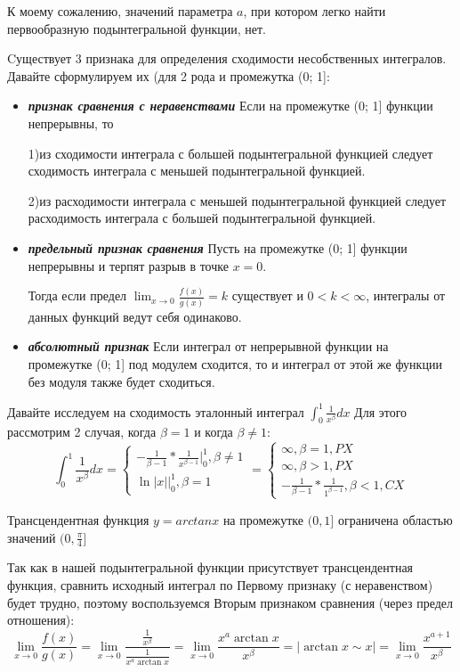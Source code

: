 \documentclass[12pt, a4paper]{article}
\begin{document}
К моему сожалению, значений параметра $a$, при котором легко найти первообразную подынтегральной функции, нет. 

Cуществует 3 признака для определения сходимости несобственных интегралов. Давайте сформулируем их (для 2 рода и промежутка (0; 1]:
\begin{itemize}
\item \textbf{\textit{признак сравнения с неравенствами}}
Если на промежутке (0; 1] функции непрерывны, то 

1)из сходимости интеграла с большей подынтегральной функцией следует сходимость интеграла с меньшей подынтегральной функцией.

2)из расходимости интеграла с меньшей подынтегральной функцией следует расходимость интеграла с большей подынтегральной функцией.
\item \textbf{\textit{предельный признак сравнения}}
Пусть на промежутке (0; 1] функции непрерывны и терпят разрыв в точке $x = 0$. 

Тогда если предел $\lim_{x\to0} \frac{f(x)}{g(x)} = k$ существует и $0 < k < \infty$, интегралы от данных функций ведут себя одинаково.
\item \textbf{\textit{абсолютный признак}} Если интеграл от непрерывной функции на промежутке (0; 1] под модулем сходится, то и интеграл от этой же функции без модуля также будет сходиться.
\end{itemize}

Давайте исследуем на сходимость эталонный интеграл $\int_0^1\frac{1}{x^\beta}dx$
Для этого рассмотрим 2 случая, когда $\beta = 1$ и когда $\beta \neq 1$:
\begin{equation*}
\int_0^1\frac{1}{x^\beta}dx = 
 \begin{cases}
   -\frac{1}{\beta - 1} * \frac{1}{x^{\beta - 1}}|^1_0, \beta \neq 1\\
   \ln|x||^1_0, \beta = 1
 \end{cases} =
 \begin{cases}
 	\infty, \beta = 1,  PX\\
 	\infty, \beta > 1,  PX\\
 	-\frac{1}{\beta - 1} * \frac{1}{1^{\beta - 1}}, \beta < 1 , CX
 \end{cases}
\end{equation*}

Трансцендентная функция $y = arctan x$ на промежутке $(0, 1]$ ограничена областью значений $(0, \frac{\pi}{4}]$

Так как в нашей подынтегральной функции присутствует трансцендентная функция, сравнить исходный интеграл по Первому признаку (с неравенством) будет трудно, поэтому воспользуемся Вторым признаком сравнения (через предел отношения):
 \begin{equation*}
 	\lim_{x\to0}\frac{f(x)}{g(x)} = \lim_{x\to0}\frac{\frac{1}{x^\beta}}{\frac{1}{x^a\arctan x}} = \lim_{x\to0}\frac{x^a \arctan x}{x^\beta} = |\arctan x \sim x| = \lim_{x\to0}\frac{x^{a+1}}{x^\beta}
 \end{equation*}
 
\end{document}
